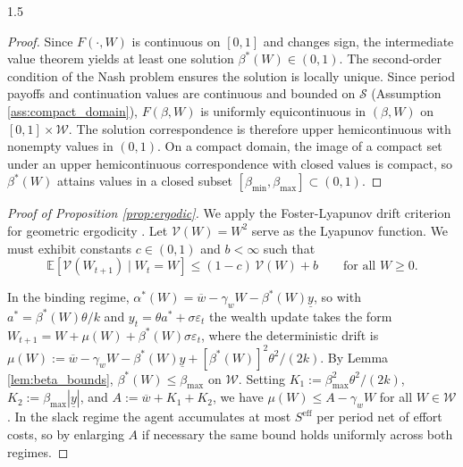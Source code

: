 \documentclass[12pt]{article}
\theoremstyle{definition}
\theoremstyle{plain}
\begin{document}
\begin{spacing}{1.5}
\begin{appendices}
\begin{proof}
    Since $F(\cdot, W)$ is continuous on $[0,1]$ and changes sign, the intermediate value theorem yields at least one solution $\beta^*(W) \in (0,1)$. The second-order condition of the Nash problem ensures the solution is locally unique. Since period payoffs and continuation values are continuous and bounded on $\mathcal{S}$ (Assumption \ref{ass:compact_domain}), $F(\beta, W)$ is uniformly equicontinuous in $(\beta, W)$ on $[0,1] \times \mathcal{W}$. The solution correspondence is therefore upper hemicontinuous with nonempty values in $(0,1)$. On a compact domain, the image of a compact set under an upper hemicontinuous correspondence with closed values is compact, so $\beta^*(W)$ attains values in a closed subset $[\beta_{\min}, \beta_{\max}] \subset (0,1)$.
    \end{proof}

    \begin{proof}[Proof of Proposition \ref{prop:ergodic}]
    We apply the Foster-Lyapunov drift criterion for geometric ergodicity \parencite[Theorem 15.2.5]{meyn2009}. Let $\mathcal{V}(W) = W^2$ serve as the Lyapunov function. We must exhibit constants $c \in (0,1)$ and $b < \infty$ such that
    \begin{equation}\label{eq:fl}
        \mathbb{E}[\mathcal{V}(W_{t+1}) \mid W_t = W] \leq (1-c)\,\mathcal{V}(W) + b \qquad \text{for all } W \geq 0.
    \end{equation}

    In the binding regime, $\alpha^*(W) = \overline{w} - \gamma_w W - \beta^*(W)\underline{y}$, so with $a^* = \beta^*(W)\theta/k$ and $y_t = \theta a^* + \sigma\varepsilon_t$ the wealth update takes the form $W_{t+1} = W + \mu(W) + \beta^*(W)\sigma\varepsilon_t$, where the deterministic drift is $\mu(W) := \overline{w} - \gamma_w W - \beta^*(W)\underline{y} + [\beta^*(W)]^2\theta^2/(2k)$. By Lemma \ref{lem:beta_bounds}, $\beta^*(W) \leq \beta_{\max}$ on $\mathcal{W}$. Setting $K_1 := \beta_{\max}^2\theta^2/(2k)$, $K_2 := \beta_{\max}|\underline{y}|$, and $A := \overline{w} + K_1 + K_2$, we have $\mu(W) \leq A - \gamma_w W$ for all $W \in \mathcal{W}$. In the slack regime the agent accumulates at most $S^{\mathrm{eff}}$ per period net of effort costs, so by enlarging $A$ if necessary the same bound holds uniformly across both regimes.


\end{proof}
\end{appendices}
\end{spacing}
\end{document}
